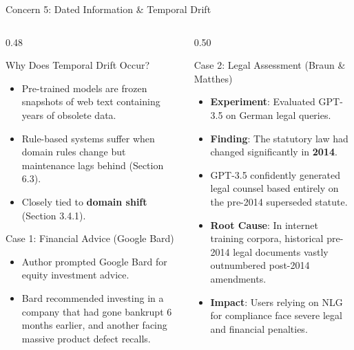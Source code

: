 \documentclass[aspectratio=169, 10pt]{beamer}
\begin{document}
\begin{frame}{Concern 5: Dated Information \& Temporal Drift}
  \begin{columns}[T]
    \begin{column}{0.48\textwidth}
      \begin{block}{Why Does Temporal Drift Occur?}
        \begin{itemize}
          \item Pre-trained models are frozen snapshots of web text containing years of obsolete data.
          \item Rule-based systems suffer when domain rules change but maintenance lags behind (Section 6.3).
          \item Closely tied to \textbf{domain shift} (Section 3.4.1).
        \end{itemize}
      \end{block}

      \begin{alertbox}{Case 1: Financial Advice (Google Bard)}
        \begin{itemize}
          \item Author prompted Google Bard for equity investment advice.
          \item Bard recommended investing in a company that had gone \alert{bankrupt 6 months earlier}, and another facing massive product defect recalls.
        \end{itemize}
      \end{alertbox}
    \end{column}

    \begin{column}{0.50\textwidth}
      \begin{casebox}{Case 2: Legal Assessment (Braun \& Matthes)}
        \begin{itemize}
          \item \textbf{Experiment}: Evaluated GPT-3.5 on German legal queries.
          \item \textbf{Finding}: The statutory law had changed significantly in \textbf{2014}.
          \item GPT-3.5 confidently generated legal counsel based entirely on the \alert{pre-2014 superseded statute}.
          \item \textbf{Root Cause}: In internet training corpora, historical pre-2014 legal documents vastly outnumbered post-2014 amendments.
          \item \textbf{Impact}: Users relying on NLG for compliance face severe legal and financial penalties.
        \end{itemize}
      \end{casebox}
    \end{column}
  \end{columns}
\end{frame}
\end{document}
